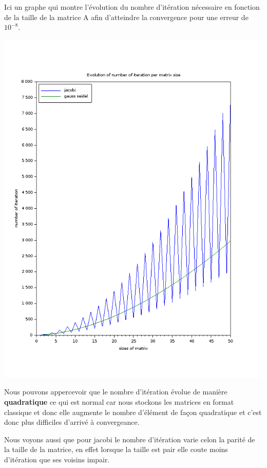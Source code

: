 \documentclass[11pt]{article}
\begin{document}
Ici un graphe qui montre l'évolution du nombre d'itération nécessaire
en fonction de la taille de la matrice A afin d'atteindre la
convergence pour une erreur de $10^{-8}$.

\includegraphics[scale=0.5]{img/number_of_iteration.png}

Nous pouvons appercevoir que le nombre d'itération évolue de manière
\textbf{quadratique} ce qui est normal car nous stockons les matrices en format
classique et donc elle augmente le nombre d'élément de façon
quadratique et c'est donc plus difficiles d'arrivé à convergeance.\newline

\vspace{5mm}

Nous voyons aussi que pour jacobi le nombre d'itération varie celon la
parité de la taille de la matrice, en effet lorsque la taille est pair
elle coute moins d'itération que ses voisins impair.\newline
\end{document}
